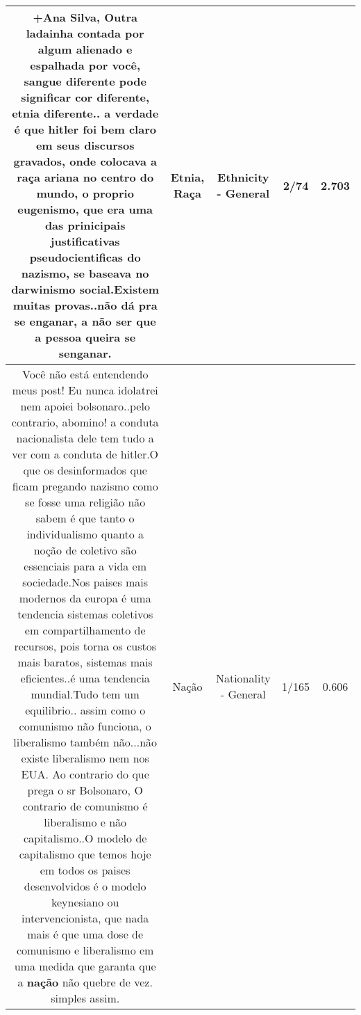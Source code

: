 \documentclass[11pt]{article}
\newlength\mylength
\begin{document}
\begin{center}
\begin{longtable}{|C{.65\mylength}|C{.30\mylength}|C{.12\mylength}|C{.12\mylength}|C{.12\mylength}|}
  \small +Ana Silva, Outra ladainha contada por algum alienado e espalhada por você, sangue diferente pode significar cor diferente, \textbf{etnia} diferente.. a verdade é que hitler foi bem claro em seus discursos gravados, onde colocava a \textbf{raça} ariana no centro do mundo, o proprio eugenismo, que era uma das prinicipais justificativas pseudocientificas do nazismo, se baseava no darwinismo social.Existem muitas provas..não dá pra se enganar, a não ser que a pessoa queira se senganar.\normalsize   & Etnia, Raça & Ethnicity - General & 2/74 & 2.703 \\  \hline
  \small Você não está entendendo meus post! Eu nunca idolatrei nem apoiei bolsonaro..pelo contrario, abomino! a conduta nacionalista dele tem tudo a ver com a conduta de hitler.O que os desinformados que ficam pregando nazismo como se fosse uma religião não sabem é que tanto o individualismo quanto a noção de coletivo são essenciais para a vida em sociedade.Nos paises mais modernos da europa é uma tendencia sistemas coletivos em compartilhamento de recursos, pois torna os custos mais baratos, sistemas mais eficientes..é uma tendencia mundial.Tudo tem um equilibrio.. assim como o comunismo não funciona, o liberalismo também não...não existe liberalismo nem nos EUA. Ao contrario do que prega o sr Bolsonaro, O contrario de comunismo é liberalismo e não capitalismo..O modelo de capitalismo que temos hoje em todos os paises desenvolvidos é o modelo keynesiano ou intervencionista, que nada mais é que uma dose de comunismo e liberalismo em uma medida que garanta que a \textbf{nação} não quebre de vez. simples assim.\normalsize   & Nação & Nationality - General & 1/165 & 0.606 \\  \hline

\end{longtable}
\end{center}
\end{document}
